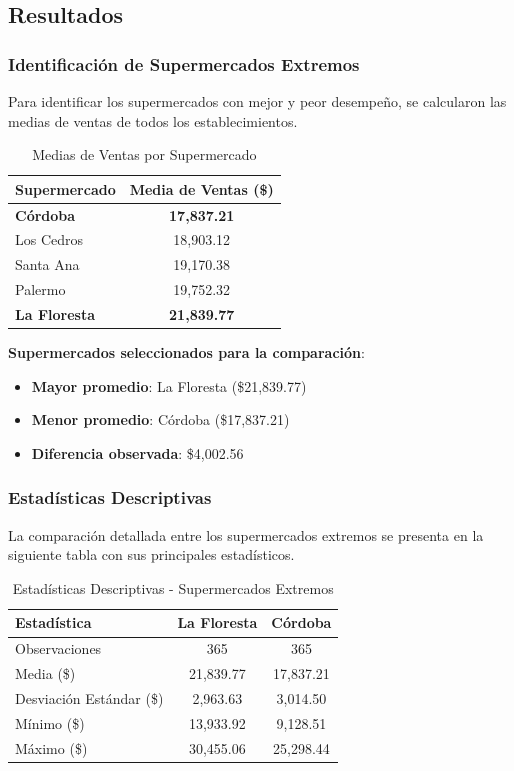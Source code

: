 \documentclass[11pt,a4paper]{article}
\begin{document}
\subsection{Resultados}

\subsubsection{Identificación de Supermercados Extremos}

Para identificar los supermercados con mejor y peor desempeño, se calcularon las medias de ventas de todos los establecimientos.

\begin{table}[H]
\centering
\caption{Medias de Ventas por Supermercado}
\begin{tabular}{|l|c|}
\hline
\textbf{Supermercado} & \textbf{Media de Ventas (\$)} \\
\hline
\textbf{Córdoba} & \textbf{17,837.21} \\
Los Cedros & 18,903.12 \\
Santa Ana & 19,170.38 \\
Palermo & 19,752.32 \\
\textbf{La Floresta} & \textbf{21,839.77} \\
\hline
\end{tabular}
\end{table}

\textbf{Supermercados seleccionados para la comparación}:
\begin{itemize}
    \item \textbf{Mayor promedio}: La Floresta (\$21,839.77)
    \item \textbf{Menor promedio}: Córdoba (\$17,837.21)
    \item \textbf{Diferencia observada}: \$4,002.56
\end{itemize}

\subsubsection{Estadísticas Descriptivas}

La comparación detallada entre los supermercados extremos se presenta en la siguiente tabla con sus principales estadísticos.

\begin{table}[H]
\centering
\caption{Estadísticas Descriptivas - Supermercados Extremos}
\begin{tabular}{|l|c|c|}
\hline
\textbf{Estadística} & \textbf{La Floresta} & \textbf{Córdoba} \\
\hline
Observaciones & 365 & 365 \\
Media (\$) & 21,839.77 & 17,837.21 \\
Desviación Estándar (\$) & 2,963.63 & 3,014.50 \\
Mínimo (\$) & 13,933.92 & 9,128.51 \\
Máximo (\$) & 30,455.06 & 25,298.44 \\
\hline
\end{tabular}
\end{table}
\end{document}
